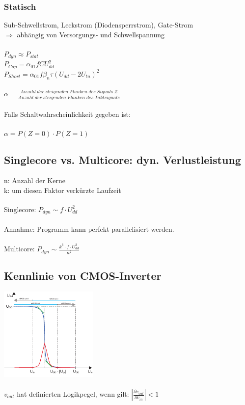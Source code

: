\documentclass[a4paper,twocolumn,10pt]{article}
\begin{document}
\subsubsection*{Statisch}
Sub-Schwellstrom, Leckstrom (Diodensperrstrom), Gate-Strom \\
 $\Rightarrow$ abhängig von Versorgungs- und Schwellspannung\\\\
 $P_{dyn} \approx P_{stat}$\\
$P_{Cap}=\alpha_{01}fCU_{dd}^2$\\
$P_{Short}=\alpha_{01}f\beta_n\tau(U_{dd}-2U_{tn})^2$\\\\
$\alpha = \frac{Anzahl\; der\; steigenden\; Flanken\; des\; Signals\ Z}{Anzahl\; der\; steigenden\; Flanken\; des\; Taktsignals}$\\\\
Falls Schaltwahrscheinlichkeit gegeben ist:\\\\
$\alpha = P(Z=0)\cdot P(Z=1)$

\subsection*{Singlecore vs. Multicore: dyn. Verlustleistung}
n: Anzahl der Kerne\\
k: um diesen Faktor verkürzte Laufzeit\\\\
Singlecore: $P_{dyn} \sim f\cdot U_{dd}^2$\\\\
Annahme: Programm kann perfekt parallelisiert werden.\\\\
Multicore: $P_{dyn} \sim \frac{k^3\cdot f \cdot U_{dd}^2}{n^2}$

\subsection*{Kennlinie von CMOS-Inverter}
\includegraphics[width=0.36\textwidth]{Grafiken/Inverter_Kennlinie}\\\\
$v_{out}$ hat definierten Logikpegel, wenn gilt: $|\frac{\partial v_{out}}{\partial v_{in}}|<1$
\end{document}
